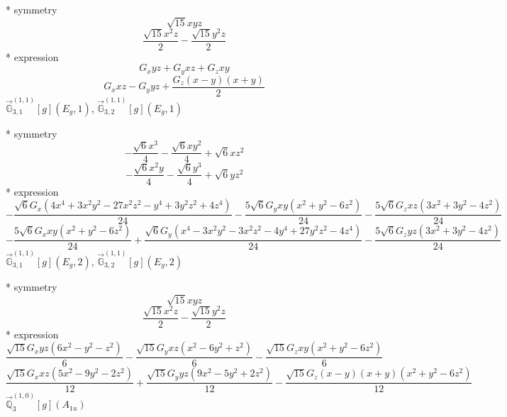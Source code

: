 \documentclass[fleqn,8pt]{jsarticle}
\begin{document}
\noindent\quad ** symmetry
\begin{dmath*}
\sqrt{15} x y z
\end{dmath*}
\begin{dmath*}
\frac{\sqrt{15} x^{2} z}{2} - \frac{\sqrt{15} y^{2} z}{2}
\end{dmath*}
\noindent\quad ** expression
\begin{dmath*}
G_{x} y z + G_{y} x z + G_{z} x y
\end{dmath*}
\begin{dmath*}
G_{x} x z - G_{y} y z + \frac{G_{z} \left(x - y\right) \left(x + y\right)}{2}
\end{dmath*}
\noindent\quad $\vec{\mathbb{G}}_{3,1}^{(1,1)}[g](E_{g},1)$, $\vec{\mathbb{G}}_{3,2}^{(1,1)}[g](E_{g},1)$

\noindent\quad ** symmetry
\begin{dmath*}
- \frac{\sqrt{6} x^{3}}{4} - \frac{\sqrt{6} x y^{2}}{4} + \sqrt{6} x z^{2}
\end{dmath*}
\begin{dmath*}
- \frac{\sqrt{6} x^{2} y}{4} - \frac{\sqrt{6} y^{3}}{4} + \sqrt{6} y z^{2}
\end{dmath*}
\noindent\quad ** expression
\begin{dmath*}
- \frac{\sqrt{6} G_{x} \left(4 x^{4} + 3 x^{2} y^{2} - 27 x^{2} z^{2} - y^{4} + 3 y^{2} z^{2} + 4 z^{4}\right)}{24} - \frac{5 \sqrt{6} G_{y} x y \left(x^{2} + y^{2} - 6 z^{2}\right)}{24} - \frac{5 \sqrt{6} G_{z} x z \left(3 x^{2} + 3 y^{2} - 4 z^{2}\right)}{24}
\end{dmath*}
\begin{dmath*}
- \frac{5 \sqrt{6} G_{x} x y \left(x^{2} + y^{2} - 6 z^{2}\right)}{24} + \frac{\sqrt{6} G_{y} \left(x^{4} - 3 x^{2} y^{2} - 3 x^{2} z^{2} - 4 y^{4} + 27 y^{2} z^{2} - 4 z^{4}\right)}{24} - \frac{5 \sqrt{6} G_{z} y z \left(3 x^{2} + 3 y^{2} - 4 z^{2}\right)}{24}
\end{dmath*}
\noindent\quad $\vec{\mathbb{G}}_{3,1}^{(1,1)}[g](E_{g},2)$, $\vec{\mathbb{G}}_{3,2}^{(1,1)}[g](E_{g},2)$

\noindent\quad ** symmetry
\begin{dmath*}
\sqrt{15} x y z
\end{dmath*}
\begin{dmath*}
\frac{\sqrt{15} x^{2} z}{2} - \frac{\sqrt{15} y^{2} z}{2}
\end{dmath*}
\noindent\quad ** expression
\begin{dmath*}
\frac{\sqrt{15} G_{x} y z \left(6 x^{2} - y^{2} - z^{2}\right)}{6} - \frac{\sqrt{15} G_{y} x z \left(x^{2} - 6 y^{2} + z^{2}\right)}{6} - \frac{\sqrt{15} G_{z} x y \left(x^{2} + y^{2} - 6 z^{2}\right)}{6}
\end{dmath*}
\begin{dmath*}
\frac{\sqrt{15} G_{x} x z \left(5 x^{2} - 9 y^{2} - 2 z^{2}\right)}{12} + \frac{\sqrt{15} G_{y} y z \left(9 x^{2} - 5 y^{2} + 2 z^{2}\right)}{12} - \frac{\sqrt{15} G_{z} \left(x - y\right) \left(x + y\right) \left(x^{2} + y^{2} - 6 z^{2}\right)}{12}
\end{dmath*}
\noindent\quad $\vec{\mathbb{Q}}_{3}^{(1,0)}[g](A_{1u})$
\end{document}

